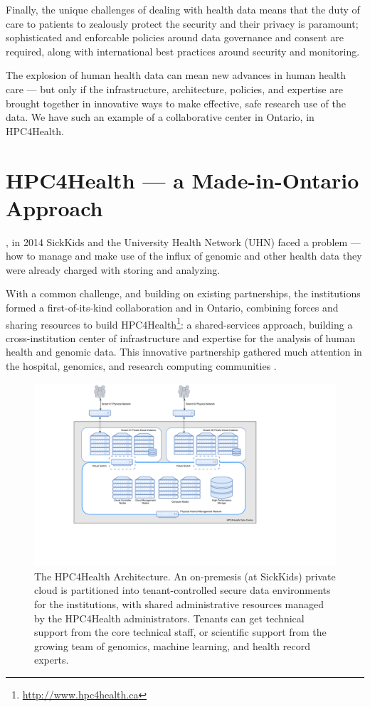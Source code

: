 \documentclass[twoside,symmetric,sfsidenotes,notoc]{tufte-book}
\begin{document}
Finally, the unique challenges of dealing with health data means that the duty
of care to patients to zealously protect the security and their privacy is
paramount; sophisticated and enforcable policies around data governance and consent
are required, along with international best practices around security and monitoring.

The explosion of human health data can mean new advances in human health care ---
but only if the infrastructure, architecture, policies, and expertise are brought
together in innovative ways to make effective, safe research use of the data.
We have such an example of a collaborative center in Ontario, in HPC4Health.

\chapter{HPC4Health --- a Made-in-Ontario Approach}
\label{ch:hpc4health}

, in 2014 SickKids and 
the University Health Network (UHN) faced a problem --- how to manage and make use of the influx 
of genomic and other health data they were already charged with storing and analyzing.

With a common challenge, and building on existing partnerships, the institutions formed a
first-of-its-kind collaboration and in Ontario, combining forces and sharing
resources to build HPC4Health\footnote{\url{http://www.hpc4health.ca}}: a
shared-services approach, building a cross-institution center
of infrastructure and expertise
for the analysis of human health and genomic data.  This innovative 
partnership gathered much attention in the hospital, genomics, and 
research computing communities \citep{hn-hpc4health, gw-hpc4health, inside-hpc-h4h-mellanox, openstack-hpc}.

\begin{figure}
  \includegraphics{HPC4Health_1.pdf}
  \caption[HPC4Health Architecture Diagram]{The HPC4Health Architecture.  An on-premesis (at SickKids) private
  cloud is partitioned into tenant-controlled secure data environments for the institutions, with shared administrative
  resources managed by the HPC4Health administrators.  Tenants can get technical support from the core
  technical staff, or scientific support from the growing team of genomics, machine learning, and
  health record experts. }
  \label{fig:hpc4health-architecture}
\end{figure}
\end{document}
